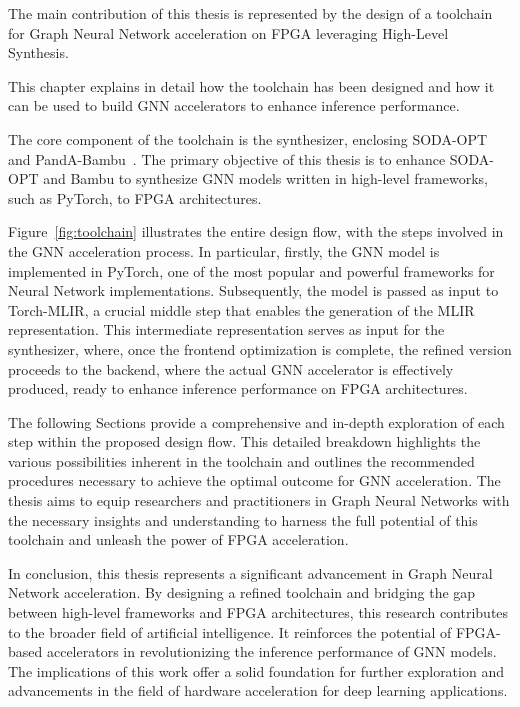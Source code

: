 The main contribution of this thesis is represented by the design of a toolchain for Graph Neural Network acceleration on FPGA leveraging High-Level Synthesis.

This chapter explains in detail how the toolchain has been designed and how it can be used to build GNN accelerators to enhance inference performance.

The core component of the toolchain is the synthesizer, enclosing SODA-OPT~\cite{9786533} and PandA-Bambu~\cite{9586110}.
The primary objective of this thesis is to enhance SODA-OPT and Bambu to synthesize GNN models written in high-level frameworks, such as PyTorch, to FPGA architectures.

Figure~\ref{fig:toolchain} illustrates the entire design flow, with the steps involved in the GNN acceleration process.
In particular, firstly, the GNN model is implemented in PyTorch, one of the most popular and powerful frameworks for Neural Network implementations.
Subsequently, the model is passed as input to Torch-MLIR, a crucial middle step that enables the generation of the MLIR representation.
This intermediate representation serves as input for the synthesizer, where, once the frontend optimization is complete, the refined version proceeds to the backend, where the actual GNN accelerator is effectively produced, ready to enhance inference performance on FPGA architectures.

The following Sections provide a comprehensive and in-depth exploration of each step within the proposed design flow.
This detailed breakdown highlights the various possibilities inherent in the toolchain and outlines the recommended procedures necessary to achieve the optimal outcome for GNN acceleration.
The thesis aims to equip researchers and practitioners in Graph Neural Networks with the necessary insights and understanding to harness the full potential of this toolchain and unleash the power of FPGA acceleration.

In conclusion, this thesis represents a significant advancement in Graph Neural Network acceleration.
By designing a refined toolchain and bridging the gap between high-level frameworks and FPGA architectures, this research contributes to the broader field of artificial intelligence.
It reinforces the potential of FPGA-based accelerators in revolutionizing the inference performance of GNN models.
The implications of this work offer a solid foundation for further exploration and advancements in the field of hardware acceleration for deep learning applications.

